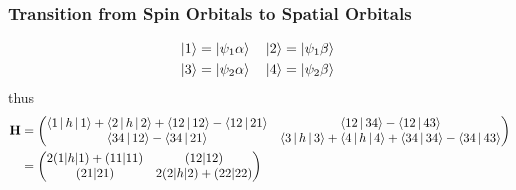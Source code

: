 \documentclass[a4paper]{article}
\begin{document}
\subsubsection{Transition from Spin Orbitals to Spatial Orbitals}
\begin{equation}
\begin{aligned}
\ket{1} = \ket{\psi_1\alpha} & \quad \ket{2} = \ket{\psi_1\beta}\\
\ket{3} = \ket{\psi_2\alpha} & \quad \ket{4} = \ket{\psi_2\beta}\
\end{aligned}
\end{equation}
thus
\begin{equation}\label{key}
\begin{aligned}
\vb{H} &= \mqty(\Braket{1|h|1} + \Braket{2|h|2} + \Braket{12|12} - \Braket{12|21} & \Braket{12|34} - \Braket{12|43}\\
\Braket{34|12} - \Braket{34|21} & \Braket{3|h|3} + \Braket{4|h|4} + \Braket{34|34} - \Braket{34|43})\\
&= \mqty(2(1|h|1) + (11|11) & (12|12)\\
(21|21) & 2(2|h|2) + (22|22))
\end{aligned}
\end{equation}
\end{document}
